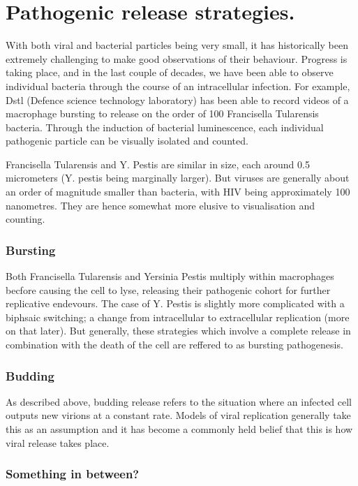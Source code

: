 \section{Pathogenic release strategies.} 

With both viral and bacterial particles being very small, it has historically been extremely challenging to make good observations of their behaviour. Progress is taking place, and in the last couple of decades, we have been able to observe individual bacteria through the course of an intracellular infection. For example, Dstl (Defence science technology laboratory) has been able to record videos of a macrophage bursting to release on the order of 100 Francisella Tularensis bacteria. Through the induction of bacterial luminescence, each individual pathogenic particle can be visually isolated and counted.\par
Francisella Tularensis and Y. Pestis are similar in size, each around 0.5 micrometers (Y. pestis being marginally larger). But viruses are generally about an order of magnitude smaller than bacteria, with HIV being approximately 100 nanometres. They are hence somewhat more elusive to visualisation and counting.\par 


\subsubsection*{Bursting}
Both Francisella Tularensis and Yersinia Pestis multiply within macrophages becfore causing the cell to lyse, releasing their pathogenic cohort for further replicative endevours. The case of Y. Pestis is slightly more complicated with a biphsaic switching; a change from intracellular to extracellular replication (more on that later). But generally, these strategies which involve a complete release in combination with the death of the cell are reffered to as bursting pathogenesis.

\subsubsection*{Budding}

As described above, budding release refers to the situation where an infected cell outputs new virions at a constant rate. Models of viral replication generally take this as an assumption and it has become a commonly held belief that this is how viral release takes place. 


\subsubsection*{Something in between?}

